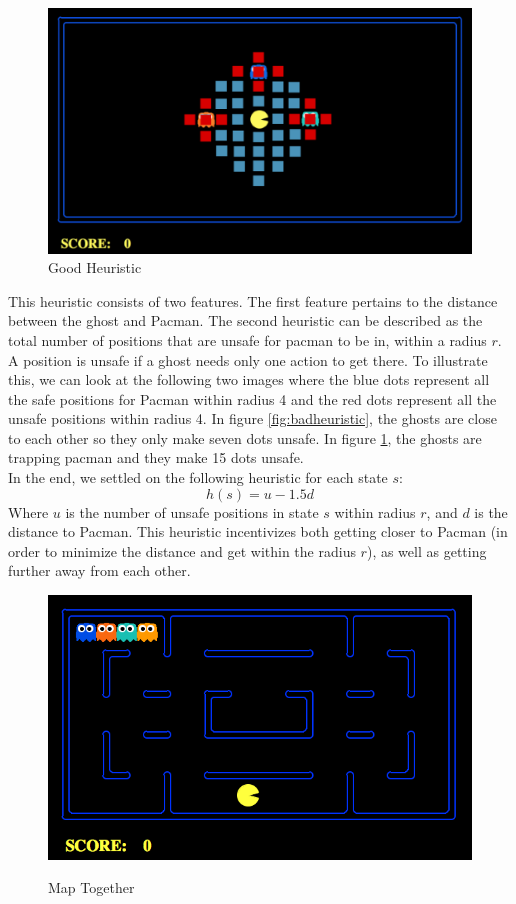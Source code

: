 \documentclass[11pt]{article}
\begin{document}
\begin{multicols}{2}
\begin{figure}[H]
	\includegraphics[width=\columnwidth]{goodheuristic.png}
	\caption{Good Heuristic}
	\label{fig:goodheuristic}
\end{figure}

This heuristic consists of two features. The first feature pertains to the distance between the ghost and Pacman. The second heuristic can be described as the total number of positions that are unsafe for pacman to be in, within a radius $r$. A position is unsafe if a ghost needs only one action to get there. To illustrate this, we can look at the following two images where the blue dots represent all the safe positions for Pacman within radius 4 and the red dots represent all the unsafe positions within radius 4. In figure \ref{fig:badheuristic}, the ghosts are close to each other so they only make seven dots unsafe. In figure \ref{fig:goodheuristic}, the ghosts are trapping pacman and they make 15 dots unsafe.\\ 

In the end, we settled on the following heuristic for each state $s$:
$$h(s) = u - 1.5d$$ Where $u$ is the number of unsafe positions in state $s$ within radius $r$, and $d$ is the distance to Pacman. This heuristic incentivizes both getting closer to Pacman (in order to minimize the distance and get within the radius $r$), as well as getting further away from each other.

\begin{figure}
	\includegraphics[width=\columnwidth]{maptogether.png}\\
	\caption{Map Together}
	\label{fig:maptogether}
\end{figure}


\end{multicols}
\end{document}
